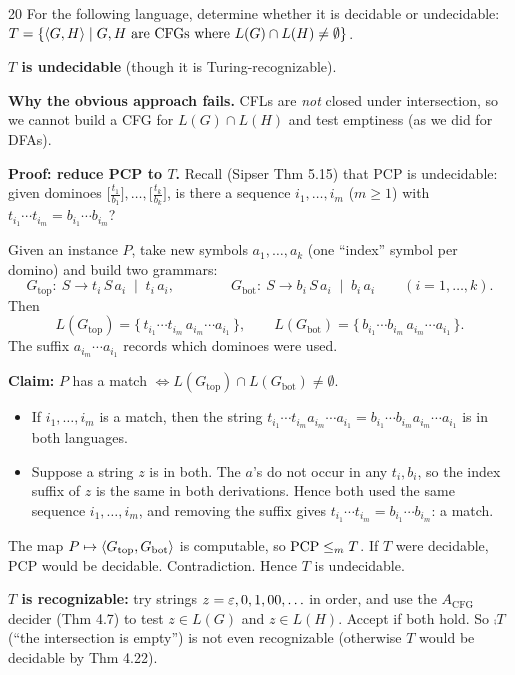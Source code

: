 \begin{question}{20}
For the following language, determine whether it is decidable or undecidable:
$T=\{\langle G,H\rangle\mid G,H \text{ are CFGs where } L(G)\cap L(H)\neq\emptyset\}$.
\end{question}
\begin{soln}
\textbf{$T$ is undecidable} (though it is Turing-recognizable).

\textbf{Why the obvious approach fails.} CFLs are \emph{not} closed under intersection, so we cannot build a CFG for $L(G)\cap L(H)$ and test emptiness (as we did for DFAs).

\textbf{Proof: reduce PCP to $T$.} Recall (Sipser Thm 5.15) that PCP is undecidable: given dominoes $\bigl[\tfrac{t_1}{b_1}\bigr],\dots,\bigl[\tfrac{t_k}{b_k}\bigr]$, is there a sequence $i_1,\dots,i_m$ ($m\ge1$) with $t_{i_1}\cdots t_{i_m}=b_{i_1}\cdots b_{i_m}$?

Given an instance $P$, take new symbols $a_1,\dots,a_k$ (one ``index'' symbol per domino) and build two grammars:
\[
G_{\mathrm{top}}:\ S\to t_i\,S\,a_i \;\mid\; t_i\,a_i,
\qquad\qquad
G_{\mathrm{bot}}:\ S\to b_i\,S\,a_i \;\mid\; b_i\,a_i
\qquad(i=1,\dots,k).
\]
Then
\[
L(G_{\mathrm{top}})=\{\,t_{i_1}\cdots t_{i_m}\,a_{i_m}\cdots a_{i_1}\,\},\qquad
L(G_{\mathrm{bot}})=\{\,b_{i_1}\cdots b_{i_m}\,a_{i_m}\cdots a_{i_1}\,\}.
\]
The suffix $a_{i_m}\cdots a_{i_1}$ records which dominoes were used.

\textbf{Claim:} $P$ has a match $\iff L(G_{\mathrm{top}})\cap L(G_{\mathrm{bot}})\neq\emptyset$.
\begin{itemize}
\item[($\Rightarrow$)] If $i_1,\dots,i_m$ is a match, then the string $t_{i_1}\cdots t_{i_m}a_{i_m}\cdots a_{i_1}=b_{i_1}\cdots b_{i_m}a_{i_m}\cdots a_{i_1}$ is in both languages.
\item[($\Leftarrow$)] Suppose a string $z$ is in both. The $a$'s do not occur in any $t_i,b_i$, so the index suffix of $z$ is the same in both derivations. Hence both used the same sequence $i_1,\dots,i_m$, and removing the suffix gives $t_{i_1}\cdots t_{i_m}=b_{i_1}\cdots b_{i_m}$: a match.
\end{itemize}
The map $P\mapsto\langle G_{\mathrm{top}},G_{\mathrm{bot}}\rangle$ is computable, so $\mathrm{PCP}\le_{m} T$. If $T$ were decidable, PCP would be decidable. Contradiction. Hence $T$ is undecidable.

\textbf{$T$ is recognizable:} try strings $z=\varepsilon,0,1,00,\ldots$ in order, and use the $A_{\mathrm{CFG}}$ decider (Thm 4.7) to test $z\in L(G)$ and $z\in L(H)$. Accept if both hold. So $\comp T$ (``the intersection is empty'') is not even recognizable (otherwise $T$ would be decidable by Thm 4.22).
\end{soln}
